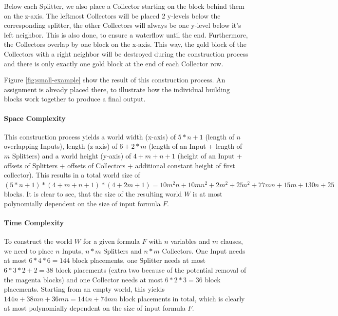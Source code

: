 Below each Splitter, we also place a Collector starting on the block behind them on the z-axis. The leftmost Collectors will be placed 2 y-levels below the corresponding splitter, the other Collectors will always be one y-level below it's left neighbor. This is also done, to ensure a waterflow until the end. Furthermore, the Collectors overlap by one block on the x-axis. This way, the gold block of the Collectors with a right neighbor will be destroyed during the construction process and there is only exactly one gold block at the end of each Collector row.
\linebreak

Figure \ref{fig:small-example} show the result of this construction process. An assignment is already placed there, to illustrate how the individual building blocks work together to produce a final output.



\paragraph{Space Complexity}
This construction process yields a world width (x-axis) of $5 * n + 1$ (length of $n$ overlapping Inputs), length (z-axis) of $6 + 2 * m$ (length of an Input + length of $m$ Splitters) and a world height (y-axis) of $4 + m + n + 1$ (height of an Input + offsets of Splitters + offsets of Collectors + additional constant height of first collector). This results in a total world size of $(5 * n + 1) * (4 + m + n + 1) * (4 + 2m + 1) = 10m^2n + 10mn^2 + 2m^2 + 25n^2 + 77mn + 15m + 130n + 25$ blocks. It is clear to see, that the size of the resulting world $W$ is at most polynomially dependent on the size of input formula $F$.



\paragraph{Time Complexity}
To construct the world $W$ for a given formula $F$ with $n$ variables and $m$ clauses, we need to place $n$ Inputs, $n * m$ Splitters and $n * m$ Collectors. One Input needs at most $6 * 4 * 6 = 144$ block placements, one Splitter needs at most $6 * 3 * 2 + 2 = 38$ block placements (extra two because of the potential removal of the magenta blocks) and one Collector needs at most $6 * 2 * 3 = 36$ block placements.
Starting from an empty world, this yields $144n + 38mn + 36mn = 144n + 74mn$ block placements in total, which is clearly at most polynomially dependent on the size of input formula $F$.



